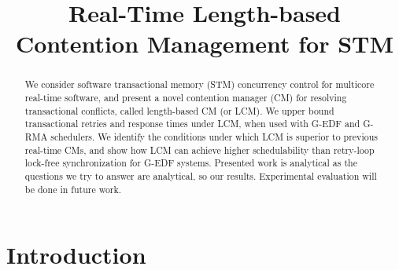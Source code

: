 \documentclass[conference]{sig-alternate}
\begin{document}
\title{Real-Time Length-based Contention Management for STM}

\maketitle

\begin{abstract}
We consider software transactional memory (STM) concurrency control for multicore real-time software, and present a novel contention manager (CM) for resolving transactional conflicts, called length-based CM (or LCM). We upper bound transactional retries and response times under LCM, when used with G-EDF and  G-RMA schedulers. We identify the conditions under which LCM is superior to previous real-time CMs, and show how LCM can achieve higher schedulability than retry-loop lock-free synchronization for G-EDF systems. %
Presented work is analytical as the questions we try to answer are analytical, so our results. Experimental evaluation will be done in future work.
\end{abstract}


\section{Introduction}
\label{sec:intro}
\end{document}
